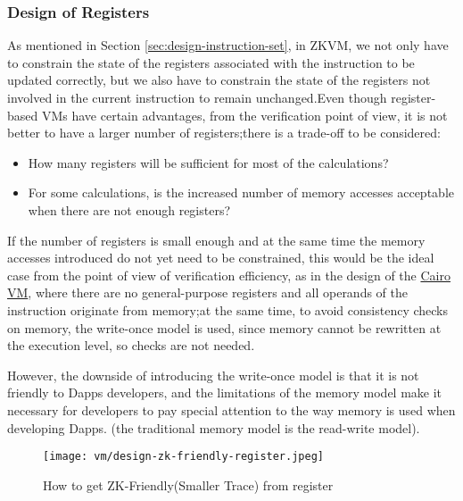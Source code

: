 \subsubsection{Design of Registers} \label{sec:design-registers}

As mentioned in Section \ref{sec:design-instruction-set}, in ZKVM, we not only have to constrain the state of the registers associated with
the instruction to be updated correctly, but we also have to constrain the state of the registers not involved in the current
instruction to remain unchanged.Even though register-based VMs have certain advantages, from the verification point of view,
it is not better to have a larger number of registers;there is a trade-off to be considered:

\begin{itemize}
    \item How many registers will be sufficient for most of the calculations?
    \item For some calculations, is the increased number of memory accesses acceptable when there are not enough registers?
\end{itemize}

If the number of registers is small enough and at the same time the memory accesses introduced do not yet need to be constrained,
this would be the ideal case from the point of view of verification efficiency, as in the design of the \href{https://starkware.co/cairo/}{Cairo VM}, where there are
no general-purpose registers and all operands of the instruction originate from memory;at the same time, to avoid consistency checks
on memory, the write-once model is used, since memory cannot be rewritten at the execution level, so checks are not needed.

However, the downside of introducing the write-once model is that it is not friendly to Dapps developers, and the limitations of
the memory model make it necessary for developers to pay special attention to the way memory is used when developing Dapps.
(the traditional memory model is the read-write model).

\begin{figure}[!ht]
    \centering
    \texttt{[image: vm/design-zk-friendly-register.jpeg]}
    \caption{How to get ZK-Friendly(Smaller Trace) from register}
    \label{fig:design-zk-friendly-register}
\end{figure}

